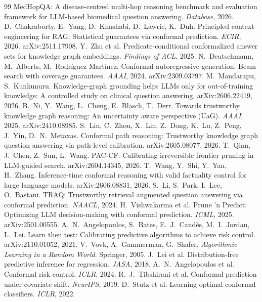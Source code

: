 \documentclass[11pt,a4paper]{article}
\theoremstyle{remark}
\begin{document}
\begin{thebibliography}{99}
 MedHopQA: A disease-centred multi-hop reasoning benchmark and evaluation framework for LLM-based biomedical question answering. \emph{Database}, 2026.
 D.~Chakraborty, E.~Yang, D.~Khashabi, D.~Lawrie, K.~Duh. Principled context engineering for RAG: Statistical guarantees via conformal prediction. \emph{ECIR}, 2026. arXiv:2511.17908.
 Y.~Zhu et al. Predicate-conditional conformalized answer sets for knowledge graph embeddings. \emph{Findings of ACL}, 2025.
 N.~Deutschmann, M.~Alberts, M.~Rodríguez Martínez. Conformal autoregressive generation: Beam search with coverage guarantees. \emph{AAAI}, 2024. arXiv:2309.03797.
 M.~Mandarapu, S.~Kunkunuru. Knowledge-graph grounding helps LLMs only for out-of-training knowledge: A controlled study on clinical question answering. arXiv:2606.22419, 2026.
 B.~Ni, Y.~Wang, L.~Cheng, E.~Blasch, T.~Derr. Towards trustworthy knowledge graph reasoning: An uncertainty aware perspective (UaG). \emph{AAAI}, 2025. arXiv:2410.08985.
 S.~Lin, C.~Zhou, X.~Lin, Z.~Dong, K.~Lu, Z.~Peng, J.~Yin, D.~N.~Metaxas. Conformal path reasoning: Trustworthy knowledge graph question answering via path-level calibration. arXiv:2605.08077, 2026.
 T.~Qian, J.~Chen, Z.~Sun, L.~Wang. PAC-CF: Calibrating irreversible frontier pruning in LLM-guided search. arXiv:2604.14345, 2026.
 T.~Wang, Y.~Shi, Y.~Yan, H.~Zhang. Inference-time conformal reasoning with valid factuality control for large language models. arXiv:2606.08831, 2026.
 S.~Li, S.~Park, I.~Lee, O.~Bastani. TRAQ: Trustworthy retrieval augmented question answering via conformal prediction. \emph{NAACL}, 2024.
 H.~Vishwakarma et al. Prune 'n Predict: Optimizing LLM decision-making with conformal prediction. \emph{ICML}, 2025. arXiv:2501.00555.
 A.~N.~Angelopoulos, S.~Bates, E.~J.~Candès, M.~I.~Jordan, L.~Lei. Learn then test: Calibrating predictive algorithms to achieve risk control. arXiv:2110.01052, 2021.
 V.~Vovk, A.~Gammerman, G.~Shafer. \emph{Algorithmic Learning in a Random World}. Springer, 2005.
 J.~Lei et al. Distribution-free predictive inference for regression. \emph{JASA}, 2018.
 A.~N.~Angelopoulos et al. Conformal risk control. \emph{ICLR}, 2024.
 R.~J.~Tibshirani et al. Conformal prediction under covariate shift. \emph{NeurIPS}, 2019.
 D.~Stutz et al. Learning optimal conformal classifiers. \emph{ICLR}, 2022.
\end{thebibliography}
\end{document}
